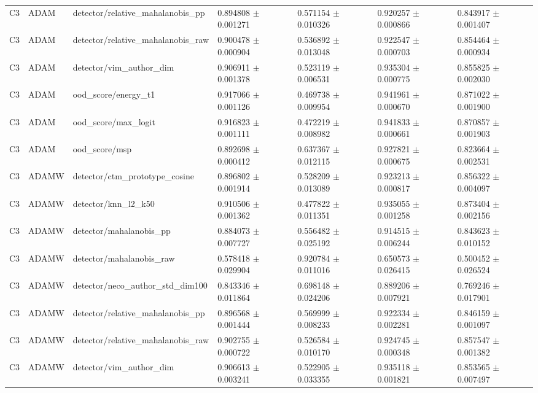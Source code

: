 \begin{longtable}{lllllll}
C3 & ADAM & detector/relative\_mahalanobis\_pp & 0.894808 $\pm$ 0.001271 & 0.571154 $\pm$ 0.010326 & 0.920257 $\pm$ 0.000866 & 0.843917 $\pm$ 0.001407 \\
C3 & ADAM & detector/relative\_mahalanobis\_raw & 0.900478 $\pm$ 0.000904 & 0.536892 $\pm$ 0.013048 & 0.922547 $\pm$ 0.000703 & 0.854464 $\pm$ 0.000934 \\
C3 & ADAM & detector/vim\_author\_dim & 0.906911 $\pm$ 0.001378 & 0.523119 $\pm$ 0.006531 & 0.935304 $\pm$ 0.000775 & 0.855825 $\pm$ 0.002030 \\
C3 & ADAM & ood\_score/energy\_t1 & 0.917066 $\pm$ 0.001126 & 0.469738 $\pm$ 0.009954 & 0.941961 $\pm$ 0.000670 & 0.871022 $\pm$ 0.001900 \\
C3 & ADAM & ood\_score/max\_logit & 0.916823 $\pm$ 0.001111 & 0.472219 $\pm$ 0.008982 & 0.941833 $\pm$ 0.000661 & 0.870857 $\pm$ 0.001903 \\
C3 & ADAM & ood\_score/msp & 0.892698 $\pm$ 0.000412 & 0.637367 $\pm$ 0.012115 & 0.927821 $\pm$ 0.000675 & 0.823664 $\pm$ 0.002531 \\
C3 & ADAMW & detector/ctm\_prototype\_cosine & 0.896802 $\pm$ 0.001914 & 0.528209 $\pm$ 0.013089 & 0.923213 $\pm$ 0.000817 & 0.856322 $\pm$ 0.004097 \\
C3 & ADAMW & detector/knn\_l2\_k50 & 0.910506 $\pm$ 0.001362 & 0.477822 $\pm$ 0.011351 & 0.935055 $\pm$ 0.001258 & 0.873404 $\pm$ 0.002156 \\
C3 & ADAMW & detector/mahalanobis\_pp & 0.884073 $\pm$ 0.007727 & 0.556482 $\pm$ 0.025192 & 0.914515 $\pm$ 0.006244 & 0.843623 $\pm$ 0.010152 \\
C3 & ADAMW & detector/mahalanobis\_raw & 0.578418 $\pm$ 0.029904 & 0.920784 $\pm$ 0.011016 & 0.650573 $\pm$ 0.026415 & 0.500452 $\pm$ 0.026524 \\
C3 & ADAMW & detector/neco\_author\_std\_dim100 & 0.843346 $\pm$ 0.011864 & 0.698148 $\pm$ 0.024206 & 0.889206 $\pm$ 0.007921 & 0.769246 $\pm$ 0.017901 \\
C3 & ADAMW & detector/relative\_mahalanobis\_pp & 0.896568 $\pm$ 0.001444 & 0.569999 $\pm$ 0.008233 & 0.922334 $\pm$ 0.002281 & 0.846159 $\pm$ 0.001097 \\
C3 & ADAMW & detector/relative\_mahalanobis\_raw & 0.902755 $\pm$ 0.000722 & 0.526584 $\pm$ 0.010170 & 0.924745 $\pm$ 0.000348 & 0.857547 $\pm$ 0.001382 \\
C3 & ADAMW & detector/vim\_author\_dim & 0.906613 $\pm$ 0.003241 & 0.522905 $\pm$ 0.033355 & 0.935118 $\pm$ 0.001821 & 0.853565 $\pm$ 0.007497 \\

\end{longtable}
